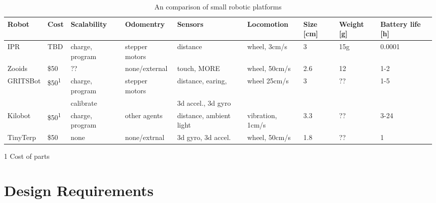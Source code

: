 \documentclass[letterpaper, 10 pt, conference]{ieeeconf}  %
\begin{document}





\begin{table*}[t]
	\centering
	\begin{threeparttable}
		\caption{An comparison of small robotic platforms}
		\label{tab:1}
 		\begin{tabular}{l l l l l l l l l} 
			\hline
 			Robot & Cost & Scalability & Odomentry & Sensors & Locomotion & Size [cm] & Weight [g] & Battery life [h] \\ 
 			\hline
 			IPR & TBD & charge, program & stepper motors & distance & wheel, 3cm/s & 3 & 15g & 0.0001\\
 			Zooids \cite{legoc_uist_2016} & \$50 & ?? & none/external & touch, MORE & wheel, 50cm/s & 2.6 & 12 & 1-2 \\ 
 			GRITSBot \cite{pickem_icra_2015} & \$50\textsuperscript{1} & charge, program & stepper motors & distance, earing, & wheel 25cm/s & 3 & ?? & 1-5 \\
 			 & & calibrate & & 3d accel., 3d gyro \\
 			Kilobot \cite{rubenstein_icra_2012} & \$50\textsuperscript{1} & charge, program & other agents & distance, ambient light & vibration, 1cm/s & 3.3 & ?? & 3-24\\
 			TinyTerp \cite{sabelhaus_icra_2013} & \$50 & none & none/extrnal & 3d gyro, 3d accel. & wheel, 50cm/s & 1.8 & ?? & 1\\
			\hline
		\end{tabular}
		\begin{tablenotes}
			\item [1] Cost of parts
		\end{tablenotes}
	\end{threeparttable}
\end{table*}

\section{Design Requirements}
\end{document}
